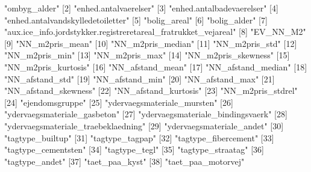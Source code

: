 \documentclass{report}
\begin{document}
\begin{Schunk}
\begin{Soutput}
 [1] "ombyg_alder"                                                  
 [2] "enhed.antalvaerelser"                                         
 [3] "enhed.antalbadevaerelser"                                     
 [4] "enhed.antalvandskylledetoiletter"                             
 [5] "bolig_areal"                                                  
 [6] "bolig_alder"                                                  
 [7] "aux.ice_info.jordstykker.registreretareal_fratrukket_vejareal"
 [8] "EV_NN_M2"                                                     
 [9] "NN_m2pris_mean"                                               
[10] "NN_m2pris_median"                                             
[11] "NN_m2pris_std"                                                
[12] "NN_m2pris_min"                                                
[13] "NN_m2pris_max"                                                
[14] "NN_m2pris_skewness"                                           
[15] "NN_m2pris_kurtosis"                                           
[16] "NN_afstand_mean"                                              
[17] "NN_afstand_median"                                            
[18] "NN_afstand_std"                                               
[19] "NN_afstand_min"                                               
[20] "NN_afstand_max"                                               
[21] "NN_afstand_skewness"                                          
[22] "NN_afstand_kurtosis"                                          
[23] "NN_m2pris_stdrel"                                             
[24] "ejendomsgruppe"                                               
[25] "ydervaegsmateriale_mursten"                                   
[26] "ydervaegsmateriale_gasbeton"                                  
[27] "ydervaegsmateriale_bindingsvaerk"                             
[28] "ydervaegsmateriale_traebeklaedning"                           
[29] "ydervaegsmateriale_andet"                                     
[30] "tagtype_builtup"                                              
[31] "tagtype_tagpap"                                               
[32] "tagtype_fibercement"                                          
[33] "tagtype_cementsten"                                           
[34] "tagtype_tegl"                                                 
[35] "tagtype_straatag"                                             
[36] "tagtype_andet"                                                
[37] "taet_paa_kyst"                                                
[38] "taet_paa_motorvej"                                            
\end{Soutput}
\end{Schunk}
\end{document}
